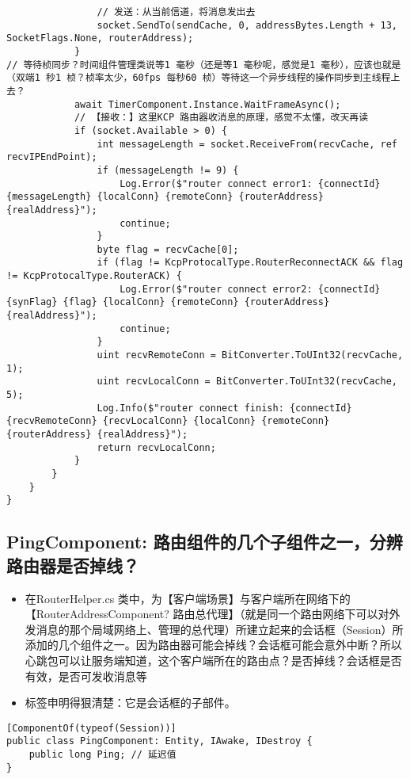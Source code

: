 \documentclass[9pt, b5paper]{article}
\begin{document}
\begin{verbatim}
                // 发送：从当前信道，将消息发出去
                socket.SendTo(sendCache, 0, addressBytes.Length + 13, SocketFlags.None, routerAddress);
            }
// 等待桢同步？时间组件管理类说等1 毫秒（还是等1 毫秒呢，感觉是1 毫秒），应该也就是（双端1 秒1 桢？桢率太少，60fps 每秒60 桢）等待这一个异步线程的操作同步到主线程上去？
            await TimerComponent.Instance.WaitFrameAsync(); 
            // 【接收：】这里KCP 路由器收消息的原理，感觉不太懂，改天再读
            if (socket.Available > 0) {
                int messageLength = socket.ReceiveFrom(recvCache, ref recvIPEndPoint);
                if (messageLength != 9) {
                    Log.Error($"router connect error1: {connectId} {messageLength} {localConn} {remoteConn} {routerAddress} {realAddress}");
                    continue;
                }
                byte flag = recvCache[0];
                if (flag != KcpProtocalType.RouterReconnectACK && flag != KcpProtocalType.RouterACK) {
                    Log.Error($"router connect error2: {connectId} {synFlag} {flag} {localConn} {remoteConn} {routerAddress} {realAddress}");
                    continue;
                }
                uint recvRemoteConn = BitConverter.ToUInt32(recvCache, 1);
                uint recvLocalConn = BitConverter.ToUInt32(recvCache, 5);
                Log.Info($"router connect finish: {connectId} {recvRemoteConn} {recvLocalConn} {localConn} {remoteConn} {routerAddress} {realAddress}");
                return recvLocalConn;
            }
        }
    }
}
\end{verbatim}
\subsection{PingComponent: 路由组件的几个子组件之一，分辨路由器是否掉线？}
\label{sec-7-6}
\begin{itemize}
\item 在RouterHelper.cs 类中，为【客户端场景】与客户端所在网络下的【RouterAddressComponent? 路由总代理】（就是同一个路由网络下可以对外发消息的那个局域网络上、管理的总代理）所建立起来的会话框（Session）所添加的几个组件之一。因为路由器可能会掉线？会话框可能会意外中断？所以心跳包可以让服务端知道，这个客户端所在的路由点？是否掉线？会话框是否有效，是否可发收消息等
\item 标签申明得狠清楚：它是会话框的子部件。
\end{itemize}
\begin{verbatim}
[ComponentOf(typeof(Session))]
public class PingComponent: Entity, IAwake, IDestroy {
    public long Ping; // 延迟值
}
\end{verbatim}
\end{document}
